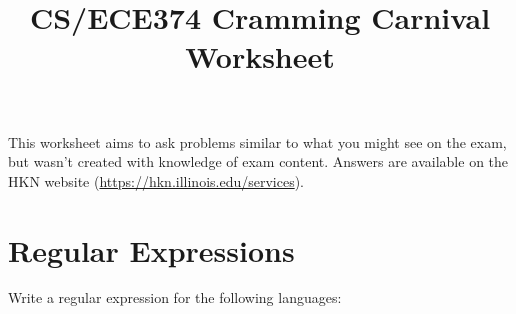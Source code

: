 \documentclass[fleqn]{article}
\title{CS/ECE374 Cramming Carnival Worksheet}
\author{}
\date{}
\begin{document}
\maketitle

\begin{center}
    This worksheet aims to ask problems similar to what you might see on the exam, but wasn't created with knowledge of exam content. Answers are available on the HKN website (\hyperlink{https://hkn.illinois.edu/services}{https://hkn.illinois.edu/services}).
\end{center}

\section{Regular Expressions}
Write a regular expression for the following languages:
\end{document}
